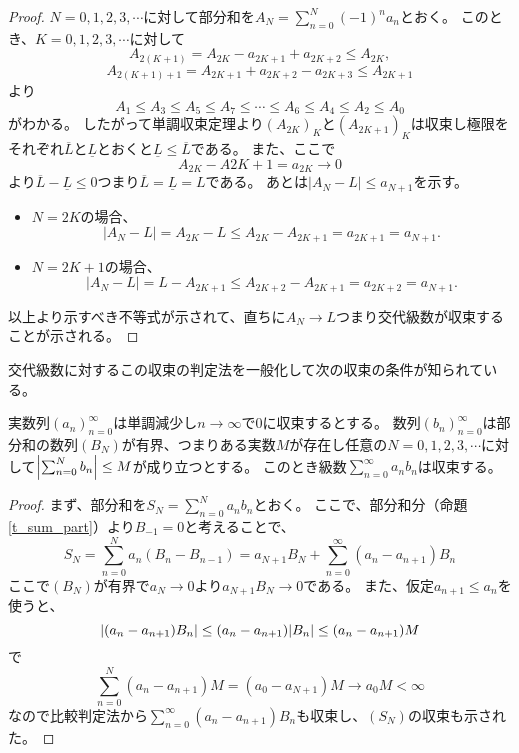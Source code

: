 \begin{proof}
$N = 0, 1, 2, 3, \cdots$に対して部分和を$A_N = \sum_{n = 0}^N (-1)^n a_n$とおく。
このとき、$K = 0, 1, 2, 3, \cdots$に対して
$$
A_{2(K+1)} = A_{2 K}-a_{2 K+1}+a_{2 K+2} \le A_{2 K},
$$
$$
A_{2(K+1)+1} = A_{2 K+1}+a_{2 K+2}-a_{2 K+3} \le A_{2 K+1}
$$
より
$$
A_1 \le A_3 \le A_5 \le A_7 \le \cdots \le A_6 \le A_4 \le A_2 \le A_0
$$
がわかる。
したがって単調収束定理より$(A_{2 K})_K$と$(A_{2 K+1})_K$は収束し極限をそれぞれ$\overline{L}$と$\underline{L}$とおくと$\underline{L} \le \overline{L}$である。
また、ここで
$$
A_{2 K}-A{2 K+1} = a_{2 K} \to 0
$$
より$\overline{L}-\underline{L} \le 0$つまり$\overline{L} = \underline{L} = L$である。
あとは$|A_N-L| \le a_{N+1}$を示す。
\begin{itemize}
\item
$N = 2 K$の場合、
$$
|A_N-L| = A_{2 K}-L \le A_{2 K}-A_{2 K+1} = a_{2 K+1} = a_{N+1}.
$$
\item
$N = 2 K+1$の場合、
$$
|A_N-L| = L-A_{2 K+1} \le A_{2 K+2}-A_{2 K+1} = a_{2 K+2} = a_{N+1}.
$$
\end{itemize}
以上より示すべき不等式が示されて、直ちに$A_N \to L$つまり交代級数が収束することが示される。
\end{proof}

交代級数に対するこの収束の判定法を一般化して次の収束の条件が知られている。

\begin{theorem}[ディリクレの判定法]
実数列$(a_n)_{n = 0}^\infty$は単調減少し$n \to \infty$で$0$に収束するとする。
数列$(b_n)_{n = 0}^\infty$は部分和の数列$(B_N)$が有界、つまりある実数$M$が存在し任意の$N = 0, 1, 2, 3, \cdots$に対して$\abs{\sum_{n = 0}^N b_n} \le M$が成り立つとする。
このとき級数$\sum_{n = 0}^\infty a_n b_n$は収束する。
\end{theorem}

\begin{proof}
まず、部分和を$S_N = \sum_{n = 0}^N a_n b_n$とおく。
ここで、部分和分（命題\ref{t_sum_part}）より$B_{-1} = 0$と考えることで、
$$
S_N = \sum_{n = 0}^N a_n(B_n-B_{n-1}) = a_{N+1}B_N+\sum_{n = 0}^\infty (a_n-a_{n+1})B_n
$$
ここで$(B_N)$が有界で$a_N \to 0$より$a_{N+1}B_N \to 0$である。
また、仮定$a_{n+1} \le a_n$を使うと、
$$
\abs{(a_n-a_{n+1})B_n} \le (a_n-a_{n+1})\abs{B_n} \le (a_n-a_{n+1})M
$$
で
$$
\sum_{n = 0}^N (a_n-a_{n+1})M = (a_0-a_{N+1})M \to a_0 M < \infty
$$
なので比較判定法から$\sum_{n = 0}^\infty (a_n-a_{n+1})B_n$も収束し、$(S_N)$の収束も示された。
\end{proof}
